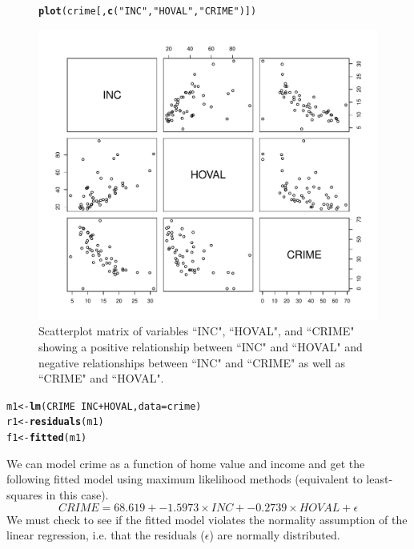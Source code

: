 \documentclass{article}\usepackage[]{graphicx}\usepackage[]{color}
\makeatletter
\def\maxwidth{ %
  \ifdim\Gin@nat@width>\linewidth
    \linewidth
  \else
    \Gin@nat@width
  \fi
}
\newcommand{\hlstr}[1]{\textcolor[rgb]{0.192,0.494,0.8}{#1}}%
\newcommand{\hlopt}[1]{\textcolor[rgb]{0,0,0}{#1}}%
\newcommand{\hlstd}[1]{\textcolor[rgb]{0.345,0.345,0.345}{#1}}%
\newcommand{\hlkwb}[1]{\textcolor[rgb]{0.69,0.353,0.396}{#1}}%
\newcommand{\hlkwc}[1]{\textcolor[rgb]{0.333,0.667,0.333}{#1}}%
\newcommand{\hlkwd}[1]{\textcolor[rgb]{0.737,0.353,0.396}{\textbf{#1}}}%
\newenvironment{kframe}{%
 \def\at@end@of@kframe{}%
 \ifinner\ifhmode%
  \def\at@end@of@kframe{\end{minipage}}%
  \begin{minipage}{\columnwidth}%
 \fi\fi%
 \def\FrameCommand##1{\hskip\@totalleftmargin \hskip-\fboxsep
 \colorbox{shadecolor}{##1}\hskip-\fboxsep
     \hskip-\linewidth \hskip-\@totalleftmargin \hskip\columnwidth}%
 \MakeFramed {\advance\hsize-\width
   \@totalleftmargin\z@ \linewidth\hsize
   \@setminipage}}%
 {\par\unskip\endMakeFramed%
 \at@end@of@kframe}
\newenvironment{knitrout}{}{} %
\makeatother
\begin{document}
\begin{figure}[hb]
\begin{knitrout}
\color{fgcolor}\begin{kframe}
\begin{alltt}
\hlkwd{plot}\hlstd{(crime[,}\hlkwd{c}\hlstd{(}\hlstr{"INC"}\hlstd{,}\hlstr{"HOVAL"}\hlstd{,}\hlstr{"CRIME"}\hlstd{)])}
\end{alltt}
\end{kframe}
\includegraphics[width=\maxwidth]{figure/scatmat} 

\end{knitrout}
\caption{Scatterplot matrix of variables ``INC", ``HOVAL", and ``CRIME" showing a positive relationship between ``INC" and ``HOVAL" and negative relationships between ``INC" and ``CRIME" as well as ``CRIME" and ``HOVAL".}
\label{scatmat}
\end{figure}

\begin{knitrout}
\color{fgcolor}\begin{kframe}
\begin{alltt}
\hlstd{m1}\hlkwb{<-}\hlkwd{lm}\hlstd{(CRIME}\hlopt{~}\hlstd{INC}\hlopt{+}\hlstd{HOVAL,}\hlkwc{data}\hlstd{=crime)}
\hlstd{r1}\hlkwb{<-}\hlkwd{residuals}\hlstd{(m1)}
\hlstd{f1}\hlkwb{<-}\hlkwd{fitted}\hlstd{(m1)}
\end{alltt}
\end{kframe}
\end{knitrout}
We can model crime as a function of home value and income and get the following fitted model using maximum likelihood methods (equivalent to least-squares in this case).
$$CRIME = 68.619 + \ensuremath{-1.5973} \times INC + \ensuremath{-0.2739} \times HOVAL + \epsilon$$
We must check to see if the fitted model violates the normality assumption of the linear regression, i.e. that the residuals ($\epsilon$) are normally distributed.\\
\end{document}
